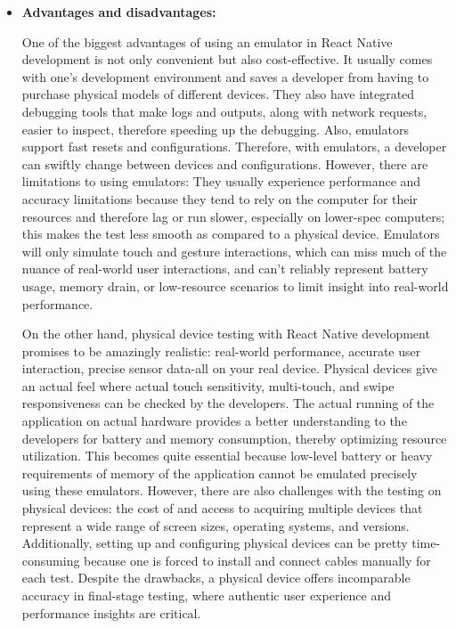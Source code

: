 \documentclass[a4paper,12pt]{article}
\begin{document}
\begin{itemize}
    \item\textbf{Advantages and disadvantages:}
    
    One of the biggest advantages of using an emulator in React Native development is not only convenient but also cost-effective. It usually comes with one's development environment and saves a developer from having to purchase physical models of different devices. They also have integrated debugging tools that make logs and outputs, along with network requests, easier to inspect, therefore speeding up the debugging. Also, emulators support fast resets and configurations. Therefore, with emulators, a developer can swiftly change between devices and configurations. However, there are limitations to using emulators: They usually experience performance and accuracy limitations because they tend to rely on the computer for their resources and therefore lag or run slower, especially on lower-spec computers; this makes the test less smooth as compared to a physical device. Emulators will only simulate touch and gesture interactions, which can miss much of the nuance of real-world user interactions, and can't reliably represent battery usage, memory drain, or low-resource scenarios to limit insight into real-world performance.

On the other hand, physical device testing with React Native development promises to be amazingly realistic: real-world performance, accurate user interaction, precise sensor data-all on your real device. Physical devices give an actual feel where actual touch sensitivity, multi-touch, and swipe responsiveness can be checked by the developers. The actual running of the application on actual hardware provides a better understanding to the developers for battery and memory consumption, thereby optimizing resource utilization. This becomes quite essential because low-level battery or heavy requirements of memory of the application cannot be emulated precisely using these emulators. However, there are also challenges with the testing on physical devices: the cost of and access to acquiring multiple devices that represent a wide range of screen sizes, operating systems, and versions. Additionally, setting up and configuring physical devices can be pretty time-consuming because one is forced to install and connect cables manually for each test. Despite the drawbacks, a physical device offers incomparable accuracy in final-stage testing, where authentic user experience and performance insights are critical.

\end{itemize}
\end{document}
